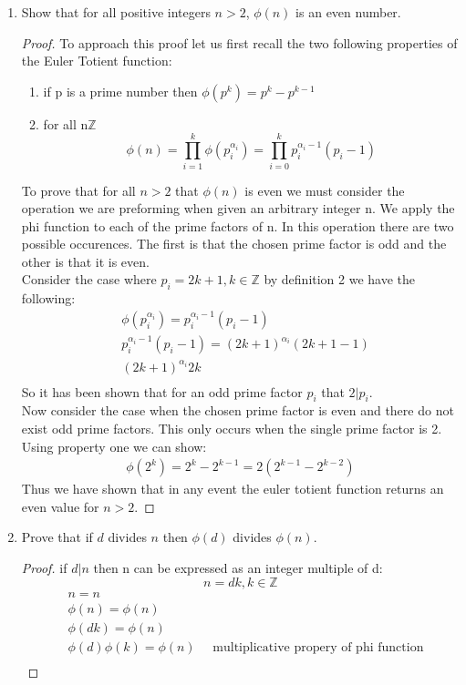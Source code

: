 \documentclass[11pt]{article}
\theoremstyle{definition}  %
\newcommand{\Z}{\mathbb{Z}}
\begin{document}
\begin{enumerate}
\begin{proof}
This means that d=gcd(b,r) and d=gcd(a,b) by definition so we arrive to the final conclusion that:
\[
  gcd(b,r)=gcd(a,b)
\]
\end{proof}
\item Show that for all positive integers $n > 2$, $\phi(n)$ is an even number.
\begin{proof}
To approach this proof let us first recall the two following properties of the Euler Totient function:
\begin{enumerate}
  \item if p is a prime number then $\phi(p^k)=p^k-p^{k-1}$
  \item for all n$\Z$\[
  \phi(n)=\prod_{i=1}^k\phi(p_i^{\alpha_i})=\prod_{i=0}^kp_i^{\alpha_i-1}(p_i-1)
\]
\end{enumerate}
To prove that for all $n >2$ that $\phi(n)$ is even we must consider the operation we are preforming when given an arbitrary integer n. We apply the phi function to each of the prime factors of n. In this operation there are two possible occurences. The first is that the chosen prime factor is odd and the other is that it is even. \\
Consider the case where $p_i=2k+1, k\in \Z$ by definition 2 we have the following:
\begin{align*}
  &\phi(p_i^{\alpha_i})=p_i^{\alpha_i-1}(p_i-1)\\
  &p_i^{\alpha_i-1}(p_i-1)=(2k+1)^{\alpha_i}(2k+1-1)\\
  &(2k+1)^{\alpha_i}2k\\
\end{align*}
So it has been shown that for an odd prime factor $p_i$ that $2|p_i$.\\
Now consider the case when the chosen prime factor is even and there do not exist odd prime factors. This only occurs when the single prime factor is 2. Using property one we can show: \begin{align*}
  \phi(2^k)=2^k-2^{k-1}=2(2^{k-1}-2^{k-2})
\end{align*}
Thus we have shown that in any event the euler totient function returns an even value for $n> 2$.
\end{proof}

\item Prove that if $d$ divides $n$ then $\phi(d)$ divides $\phi(n)$.
\begin{proof}
if $d|n$ then n can be expressed as an integer multiple of d:
\[
  n=dk,k\in \Z
\]
\begin{align*}
  &n=n\\
  &\phi(n)=\phi(n)\\
  &\phi(dk)=\phi(n)\\
    &\phi(d)\phi(k)=\phi(n)\quad \text{ multiplicative propery of phi function}\\
\end{align*}


\end{proof}
\end{enumerate}
\end{document}
